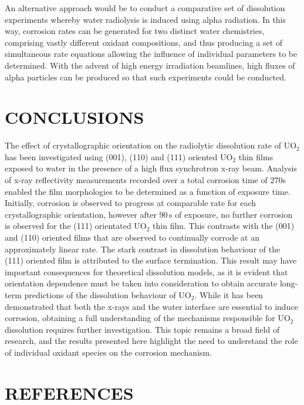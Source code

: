 \documentclass[twocolumn,prl,nobalancelastpage,aps,10pt]{revtex4-1}
\begin{document}
An alternative approach would be to conduct a comparative set of dissolution experiments whereby water radiolysis is induced using alpha radiation. In this way, corrosion rates can be generated for two distinct water chemistries, comprising vastly different oxidant compositions, and thus producing a set of simultaneous rate equations allowing the influence of individual parameters to be determined. With the advent of high energy irradiation beamlines, high fluxes  of alpha particles can be produced so that such experiments could be conducted.


\section{CONCLUSIONS}
The effect of crystallographic orientation on the radiolytic dissolution rate of UO$_2$ has been investigated using (001), (110) and (111) oriented UO$_2$ thin films exposed to water in the presence of a high flux synchrotron x-ray beam. Analysis of x-ray reflectivity measurements recorded over a total corrosion time of 270s enabled the film morphologies to be determined as a function of exposure time. Initially, corrosion is observed to progress at comparable rate for each crystallographic orientation, however after 90\,s of exposure, no further corrosion is observed for the (111) orientated UO$_2$ thin film. This contrasts with the (001) and (110) oriented films that are observed to continually corrode at an approximately linear rate. The stark contrast in dissolution behaviour of the (111) oriented film is attributed to the surface termination. This result may have important consequences for theoretical dissolution models, as it is evident that orientation dependence must be taken into consideration to obtain accurate long-term predictions of the dissolution behaviour of UO$_2$.
While it has been demonstrated that both the x-rays and the water interface are essential to induce corrosion, obtaining  a full understanding of the mechanisms responsible for UO$_2$ dissolution requires further investigation. This topic remains a broad field of research, and the results presented here highlight the need to understand the role of individual oxidant species on the corrosion mechanism.

\section{REFERENCES}

%

{}
\end{document}
